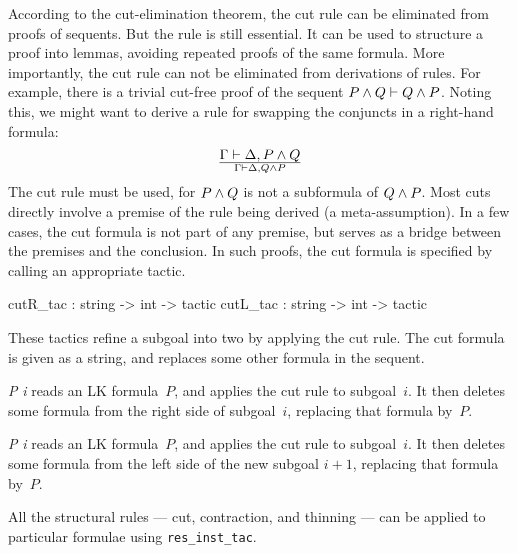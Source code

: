 According to the cut-elimination theorem, the cut rule can be eliminated
from proofs of sequents.  But the rule is still essential.  It can be used
to structure a proof into lemmas, avoiding repeated proofs of the same
formula.  More importantly, the cut rule can not be eliminated from
derivations of rules.  For example, there is a trivial cut-free proof of
the sequent \(P\wedge Q\vdash Q\wedge P\).
Noting this, we might want to derive a rule for swapping the conjuncts
in a right-hand formula:
\[ \Gamma\vdash \Delta, P\wedge Q\over \Gamma\vdash \Delta, Q\wedge P \]
The cut rule must be used, for $P\wedge Q$ is not a subformula of $Q\wedge
P$.  Most cuts directly involve a premise of the rule being derived (a
meta-assumption).  In a few cases, the cut formula is not part of any
premise, but serves as a bridge between the premises and the conclusion.
In such proofs, the cut formula is specified by calling an appropriate
tactic.

\begin{ttbox} 
cutR_tac : string -> int -> tactic
cutL_tac : string -> int -> tactic
\end{ttbox}
These tactics refine a subgoal into two by applying the cut rule.  The cut
formula is given as a string, and replaces some other formula in the sequent.
\begin{ttdescription}
\item[\ttindexbold{cutR_tac} {\it P\/} {\it i}] reads an LK formula~$P$, and
  applies the cut rule to subgoal~$i$.  It then deletes some formula from the
  right side of subgoal~$i$, replacing that formula by~$P$.
  
\item[\ttindexbold{cutL_tac} {\it P\/} {\it i}] reads an LK formula~$P$, and
  applies the cut rule to subgoal~$i$.  It then deletes some formula from the
  left side of the new subgoal $i+1$, replacing that formula by~$P$.
\end{ttdescription}
All the structural rules --- cut, contraction, and thinning --- can be
applied to particular formulae using {\tt res_inst_tac}.


